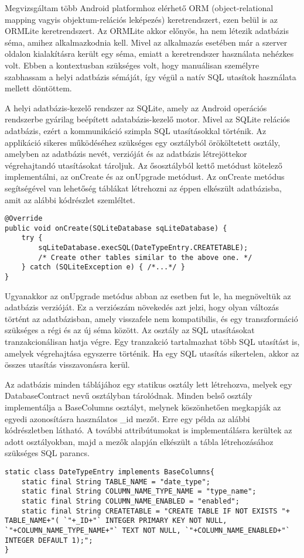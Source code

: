 Megvizsgáltam több Android platformhoz elérhető ORM (object-relational mapping vagyis objektum-relációs leképezés) keretrendszert, ezen belül is az ORMLite keretrendszert. 
Az ORMLite akkor előnyös, ha nem létezik adatbázis séma, amihez alkalmazkodnia kell.
Mivel az alkalmazás esetében már a szerver oldalon kialakításra került egy séma, emiatt a keretrendszer használata nehézkes volt.
Ebben a kontextusban szükséges volt, hogy manuálisan személyre szabhassam a helyi adatbázis sémáját, így végül a natív SQL utasítok használata mellett döntöttem.

A helyi adatbázis-kezelő rendszer az SQLite, amely az Android operációs rendszerbe gyárilag beépített adatabázis-kezelő motor.
Mivel az SQLite relációs adatbázis, ezért a kommunikáció szimpla SQL utasításokkal történik.
Az applikáció sikeres működéséhez szükséges egy  osztályból örököltetett osztály, amelyben az adatbázis nevét, verzióját és az adatbázis létrejöttekor végrehajtandó utasításokat tároljuk.
Az ősosztályból kettő metódust kötelező implementálni, az onCreate és az onUpgrade metódust.
Az onCreate metódus segítségével van lehetőség táblákat létrehozni az éppen elkészült adatbázisba, amit az alábbi kódrészlet szemléltet.
\begin{lstlisting}
@Override
public void onCreate(SQLiteDatabase sqLiteDatabase) {
	try {
		sqLiteDatabase.execSQL(DateTypeEntry.CREATETABLE);
		/* Create other tables similar to the above one. */
	} catch (SQLiteException e) { /*...*/ }
}
\end{lstlisting}
Ugyanakkor az onUpgrade metódus abban az esetben fut le, ha megnöveltük az adatbázis verzióját.
Ez a verziószám növekedés azt jelzi, hogy olyan változás történt az adatbázisban, amely visszafele nem kompatibilis, és egy transzformáció szükséges a régi és az új séma között.
Az  osztály az SQL utasításokat tranzakcionálisan hatja végre.
Egy tranzakció tartalmazhat több SQL utasítást is, amelyek végrehajtása egyszerre történik.
Ha egy SQL utasítás sikertelen, akkor az összes utasítás visszavonásra kerül.

Az adatbázis minden táblájához egy statikus osztály lett létrehozva, melyek egy DatabaseContract nevű osztályban tárolódnak.
Minden belső osztály implementálja a BaseColumns osztályt, melynek köszönhetően megkapják az egyedi azonosításra használatos  \_id mezőt.
Erre egy példa az alábbi kódrészletben látható.
A további attribútumokat is implementálásra kerültek az adott osztályokban, majd a mezők alapján elkészült a tábla létrehozásához szükséges SQL parancs.
\begin{lstlisting}
static class DateTypeEntry implements BaseColumns{
	static final String TABLE_NAME = "date_type";
	static final String COLUMN_NAME_TYPE_NAME = "type_name";
	static final String COLUMN_NAME_ENABLED = "enabled";
	static final String CREATETABLE = "CREATE TABLE IF NOT EXISTS "+ TABLE_NAME+"( `"+_ID+"` INTEGER PRIMARY KEY NOT NULL, `"+COLUMN_NAME_TYPE_NAME+"` TEXT NOT NULL, `"+COLUMN_NAME_ENABLED+"` INTEGER DEFAULT 1);";
}
\end{lstlisting}

